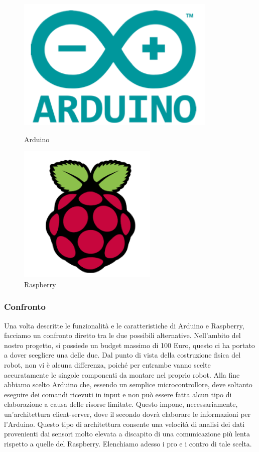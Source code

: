\documentclass[a4paper,12pt,italian]{article}
\begin{document}
\begin{figure}[H]
\centering
\begin{minipage}{.5\textwidth}
  \centering
  \includegraphics[scale=0.5]{arduino_symbol}
  \caption{Arduino}
  \label{fig:arduino_symbol}
\end{minipage}%
\begin{minipage}{.5\textwidth}
  \centering
  \includegraphics[scale=0.5]{raspberry}
  \caption{Raspberry}
  \label{fig:raspberry}
\end{minipage}
\end{figure}

\subsubsection{Confronto}
Una volta descritte le funzionalità e le caratteristiche di Arduino e Raspberry, facciamo un confronto diretto tra le due possibili alternative. Nell’ambito del nostro progetto, si possiede un budget massimo di 100 Euro, questo ci ha portato a dover scegliere una delle due. Dal punto di vista della costruzione fisica del robot, non vi è alcuna differenza, poiché per entrambe vanno scelte accuratamente le singole componenti da montare nel proprio robot. Alla fine abbiamo scelto Arduino che, essendo un semplice microcontrollore, deve soltanto eseguire dei comandi ricevuti in input e non può essere fatta alcun tipo di elaborazione a causa delle risorse limitate. Questo impone, necessariamente, un’architettura client-server, dove il secondo dovrà elaborare le informazioni per l’Arduino. Questo tipo di architettura consente una velocità di analisi dei dati provenienti dai sensori molto elevata a discapito di una comunicazione più lenta rispetto a quelle del Raspberry. Elenchiamo adesso i pro e i contro di tale scelta.	
       
\end{document}
